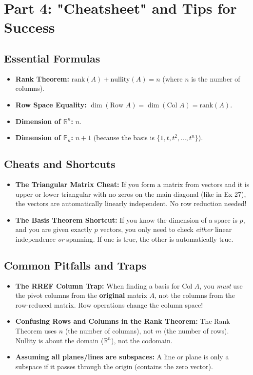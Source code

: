 \documentclass[12pt]{article}
\begin{document}
\newpage
\section{Part 4: "Cheatsheet" and Tips for Success}

\subsection{Essential Formulas}
\begin{itemize}
    \item \textbf{Rank Theorem:} $\text{rank}(A) + \text{nullity}(A) = n$ (where $n$ is the number of columns).
    \item \textbf{Row Space Equality:} $\dim(\text{Row } A) = \dim(\text{Col } A) = \text{rank}(A)$.
    \item \textbf{Dimension of $\mathbb{R}^n$:} $n$.
    \item \textbf{Dimension of $\mathbb{P}_n$:} $n + 1$ (because the basis is $\{1, t, t^2, \dots, t^n\}$).
\end{itemize}

\subsection{Cheats and Shortcuts}
\begin{itemize}
    \item \textbf{The Triangular Matrix Cheat:} If you form a matrix from vectors and it is upper or lower triangular with no zeros on the main diagonal (like in Ex 27), the vectors are automatically linearly independent. No row reduction needed!
    \item \textbf{The Basis Theorem Shortcut:} If you know the dimension of a space is $p$, and you are given exactly $p$ vectors, you only need to check \textit{either} linear independence \textit{or} spanning. If one is true, the other is automatically true.
\end{itemize}

\subsection{Common Pitfalls and Traps}
\begin{itemize}
    \item \textbf{The RREF Column Trap:} When finding a basis for $\text{Col } A$, you \textit{must} use the pivot columns from the \textbf{original} matrix $A$, not the columns from the row-reduced matrix. Row operations change the column space!
    \item \textbf{Confusing Rows and Columns in the Rank Theorem:} The Rank Theorem uses $n$ (the number of columns), not $m$ (the number of rows). Nullity is about the domain ($\mathbb{R}^n$), not the codomain.
    \item \textbf{Assuming all planes/lines are subspaces:} A line or plane is only a subspace if it passes through the origin (contains the zero vector).
\end{itemize}
\end{document}
